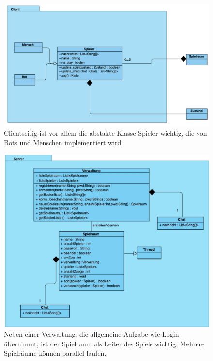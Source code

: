 \documentclass[11pt, a4paper, oneside]{memoir}                                                      %
\begin{document}
        \begin{figure}[h]
			\centering
			\includegraphics[scale=0.5]{../img/Klassen_Diagram/Client.png}
			\caption{Clientseitig ist vor allem die abstakte Klasse Spieler wichtig, die von Bots und Menschen implementiert wird}
        \end{figure}
        
        \begin{figure}[h]
			\centering
			\includegraphics[scale=0.45]{../img/Klassen_Diagram/Server.png}
            \caption{Neben einer Verwaltung, die allgemeine Aufgabe wie Login übernimmt, ist der Spielraum als Leiter des Spiels wichtig. Mehrere Spielräume können parallel laufen.}
        \end{figure}
\end{document}
